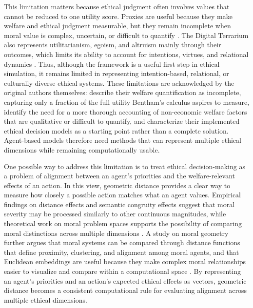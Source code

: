 \documentclass{icsthesis}
\begin{document}
\begin{mainmatter}
This limitation matters because ethical judgment often involves values that cannot be reduced to one utility score. Proxies are useful because they make welfare and ethical judgment measurable, but they remain incomplete when moral value is complex, uncertain, or difficult to quantify \citep{Baujard2009, Coyle2000, Munda2020}. The Digital Terrarium also represents utilitarianism, egoism, and altruism mainly through their outcomes, which limits its ability to account for intentions, virtues, and relational dynamics \citep{KremerHerman2024b}. Thus, although the framework is a useful first step in ethical simulation, it remains limited in representing intention-based, relational, or culturally diverse ethical systems. These limitations are acknowledged by the original authors themselves: \citet{KremerHerman2024b} describe their welfare quantification as incomplete, capturing only a fraction of the full utility Bentham's calculus aspires to measure, identify the need for a more thorough accounting of non-economic welfare factors that are qualitative or difficult to quantify, and characterize their implemented ethical decision models as a starting point rather than a complete solution. Agent-based models therefore need methods that can represent multiple ethical dimensions while remaining computationally usable.

One possible way to address this limitation is to treat ethical decision-making as a problem of alignment between an agent's priorities and the welfare-relevant effects of an action. In this view, geometric distance provides a clear way to measure how closely a possible action matches what an agent values. Empirical findings on distance effects and semantic congruity effects suggest that moral severity may be processed similarly to other continuous magnitudes, while theoretical work on moral problem spaces supports the possibility of comparing moral distinctions across multiple dimensions \citep{Powell2017, Waldner2025}. A study on moral geometry further argues that moral systems can be compared through distance functions that define proximity, clustering, and alignment among moral agents, and that Euclidean embeddings are useful because they make complex moral relationships easier to visualize and compare within a computational space \citep{Halpern2021}. By representing an agent's priorities and an action's expected ethical effects as vectors, geometric distance becomes a consistent computational rule for evaluating alignment across multiple ethical dimensions.


\end{mainmatter}
\end{document}
